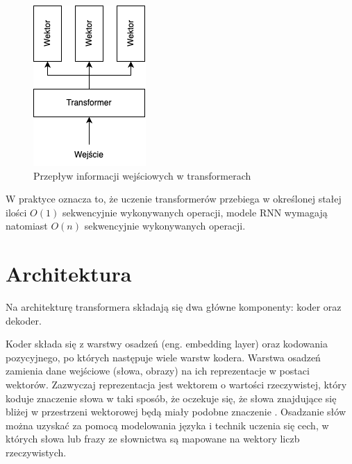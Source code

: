 \documentclass[12pt,a4paper,twoside]{book} %
\begin{document}
\begin{figure}[H]
    \centering
	\includegraphics[scale=0.60]{figs/transformer.png}
	\caption{Przepływ informacji wejściowych w transformerach}
	\label{fig:transformer_schema}
\end{figure}

W praktyce oznacza to, że uczenie transformerów przebiega w określonej stałej ilości $O(1)$ sekwencyjnie wykonywanych operacji, modele RNN wymagają natomiast $O(n)$ sekwencyjnie wykonywanych operacji. %


\section{Architektura}

Na architekturę transformera składają się dwa główne komponenty: koder oraz dekoder. %

Koder składa się z warstwy osadzeń (eng. embedding layer) oraz kodowania pozycyjnego, po których następuje wiele warstw kodera.
Warstwa osadzeń zamienia dane wejściowe (słowa, obrazy) na ich reprezentacje w postaci wektorów.
Zazwyczaj reprezentacja jest wektorem o wartości rzeczywistej, który koduje znaczenie słowa w taki sposób, że oczekuje się, że słowa znajdujące się bliżej w przestrzeni wektorowej będą miały podobne znaczenie \cite{jm3}.
Osadzanie słów można uzyskać za pomocą modelowania języka i technik uczenia się cech, w których słowa lub frazy ze słownictwa są mapowane na wektory liczb rzeczywistych.
\end{document}
